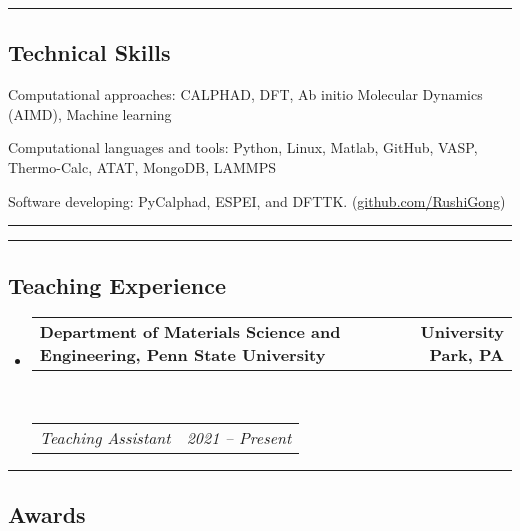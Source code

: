 \documentclass[10pt,letterpaper]{article}
\makeatletter
\newenvironment{indentsection}[1]%
{\begin{list}{}%
  {\setlength{\leftmargin}{#1}}%
  \item[]%
}
{\end{list}}
\newcommand{\headerrow}[2]
{\begin{tabular*}{\linewidth}{l@{\extracolsep{\fill}}r}
  #1 &
  #2 \\
\end{tabular*}}
\makeatother
\begin{document}
\hrule
\vspace{-0.6em}
\subsection*{Technical Skills}

\begin{indentsection}{\parindent}
\begin{description*}
  \item[Computational approaches:]
  CALPHAD, DFT, Ab initio Molecular Dynamics (AIMD), Machine learning
  \item[Computational languages and tools:]
  Python, Linux, Matlab, GitHub, VASP, Thermo-Calc, ATAT, MongoDB, LAMMPS
  \item [Software developing:]
  PyCalphad, ESPEI, and DFTTK. (\href{https://github.com/RushiGong}{github.com/RushiGong})
\end{description*}
\end{indentsection}

\hrule
\pagebreak

\hrule
\vspace{-0.6em}
\subsection*{Teaching Experience}

\renewcommand\labelitemiii{$\circ$}
\begin{itemize}
    \parskip=0.1em

    \item
    \headerrow
    {\textbf{Department of Materials Science and Engineering, Penn State University}}
    {\textbf{University Park, PA}}
    \\
    \headerrow
    {\emph{Teaching Assistant}}
    {\emph{2021 -- Present}}
\end{itemize}

\hrule
\vspace{-0.6em}
\subsection*{Awards}
\end{document}
